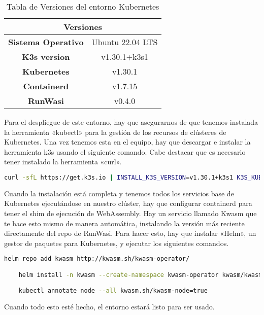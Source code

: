 \begin{table}[t!]
    \centering
    \begin{tabular}{|c|c|} \hline 
    \multicolumn{2}{|c|}{\textbf{Versiones}}\\ \hline 
        \textbf{Sistema Operativo} & Ubuntu 22.04 LTS\\ \hline 
        \textbf{K3s version} & v1.30.1+k3s1\\ \hline 
        \textbf{Kubernetes} & v1.30.1\\ \hline 
        \textbf{Containerd} & v1.7.15\\ \hline 
        \textbf{RunWasi} & v0.4.0\\ \hline
    \end{tabular}
    \caption{Tabla de Versiones del entorno Kubernetes}
    \label{tab:tabla-de-versiones-kubernetes}
\end{table}

Para el despliegue de este entorno, hay que asegurarnos de que tenemos instalada la herramienta «kubectl» para la gestión de los recursos de clústeres de Kubernetes. Una vez tenemos esta en el equipo, hay que descargar e instalar la herramienta k3s usando el siguiente comando. Cabe destacar que es necesario tener instalado la herramienta «curl».

\begin{lstlisting}[language=bash]
    curl -sfL https://get.k3s.io | INSTALL_K3S_VERSION=v1.30.1+k3s1 K3S_KUBECONFIG_MODE="644" INSTALL_K3S_EXEC="--disable traefik"  sh -
\end{lstlisting}

Cuando la instalación está completa y tenemos todos los servicios base de Kubernetes ejecutándose en nuestro clúster, hay que configurar containerd para tener el shim de ejecución de WebAssembly. Hay un servicio llamado Kwasm que te hace esto mismo de manera automática, instalando la versión más reciente directamente del repo de RunWasi. Para hacer esto, hay que instalar «Helm», un gestor de paquetes para Kubernetes, y ejecutar los siguientes comandos.

\begin{lstlisting}[language=bash]
    helm repo add kwasm http://kwasm.sh/kwasm-operator/

    helm install -n kwasm --create-namespace kwasm-operator kwasm/kwasm-operator

    kubectl annotate node --all kwasm.sh/kwasm-node=true
\end{lstlisting}

Cuando todo esto esté hecho, el entorno estará listo para ser usado.

